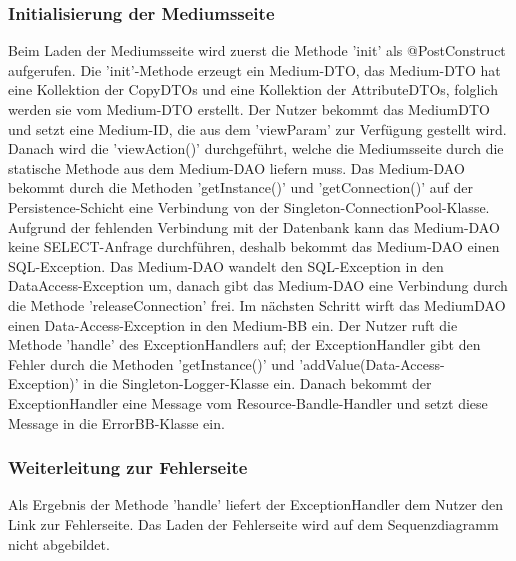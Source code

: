 \documentclass{article}
\begin{document}
\subsubsection{Initialisierung der Mediumsseite}
Beim Laden der Mediumsseite wird zuerst die Methode 'init' als @PostConstruct aufgerufen. Die 'init'-Methode erzeugt ein Medium-DTO, das Medium-DTO hat eine Kollektion der CopyDTOs und eine Kollektion der AttributeDTOs, folglich werden sie vom Medium-DTO erstellt. Der Nutzer bekommt das MediumDTO und setzt eine Medium-ID, die aus dem 'viewParam' zur Verfügung gestellt wird. Danach wird die 'viewAction()' durchgeführt, welche die Mediumsseite durch die statische Methode aus dem Medium-DAO liefern muss. Das Medium-DAO bekommt durch die Methoden 'getInstance()' und 'getConnection()' auf der Persistence-Schicht eine Verbindung von der Singleton-ConnectionPool-Klasse. Aufgrund der fehlenden Verbindung mit der Datenbank kann das Medium-DAO keine SELECT-Anfrage durchführen, deshalb bekommt das Medium-DAO einen SQL-Exception. Das Medium-DAO wandelt den SQL-Exception in den DataAccess-Exception um, danach gibt das Medium-DAO eine Verbindung durch die Methode 'releaseConnection' frei. Im nächsten Schritt wirft das MediumDAO einen Data-Access-Exception in den Medium-BB ein. Der Nutzer ruft die Methode 'handle' des ExceptionHandlers auf; der ExceptionHandler gibt den Fehler durch die Methoden 'getInstance()' und 'addValue(Data-Access-Exception)' in die Singleton-Logger-Klasse ein. Danach bekommt der ExceptionHandler eine Message vom Resource-Bandle-Handler und setzt diese Message in die ErrorBB-Klasse ein.
\subsubsection{Weiterleitung zur Fehlerseite}
Als Ergebnis der Methode 'handle' liefert der ExceptionHandler dem Nutzer den Link zur Fehlerseite. Das Laden der Fehlerseite wird auf dem Sequenzdiagramm nicht abgebildet.

\newpage

\end{document}
